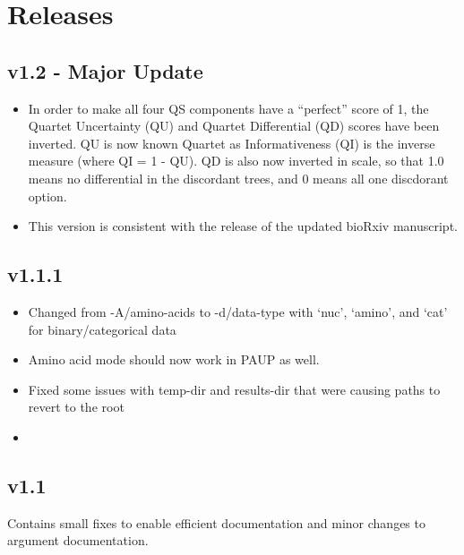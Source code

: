 \documentclass[letterpaper,12pt,english]{sphinxmanual}
\begin{document}
\chapter{Releases}
\label{\detokenize{releases::doc}}\label{\detokenize{releases:releases}}\label{\detokenize{releases:id1}}

\section{v1.2 - Major Update}
\label{\detokenize{releases:v1-2-major-update}}\begin{itemize}
\item {} 
In order to make all four QS components have a “perfect” score of 1, the Quartet Uncertainty (QU) and Quartet Differential (QD) scores have been inverted. QU is now known Quartet as Informativeness (QI) is the inverse measure (where QI = 1 - QU).  QD is also now inverted in scale, so that 1.0 means no differential in the discordant trees, and 0 means all one discdorant option.

\item {} 
This version is consistent with the release of the updated bioRxiv manuscript.

\end{itemize}


\section{v1.1.1}
\label{\detokenize{releases:v1-1-1}}\begin{itemize}
\item {} 
Changed from -A/\textendash{}amino-acids to -d/\textendash{}data-type with ‘nuc’, ‘amino’, and ‘cat’ for binary/categorical data

\item {} 
Amino acid mode should now work in PAUP as well.

\item {} 
Fixed some issues with temp-dir and results-dir that were causing paths to revert to the root

\item {} 

\end{itemize}


\section{v1.1}
\label{\detokenize{releases:v1-1}}
Contains small fixes to enable efficient documentation and minor changes to argument documentation.
\end{document}
